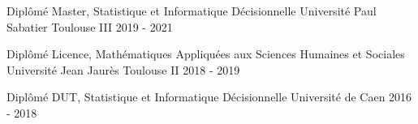 


\begin{cventries}


\cventry
{Diplômé} %
{Master, Statistique et Informatique Décisionnelle} %
{Université Paul Sabatier Toulouse III} %
{2019 - 2021} %
{} %


\cventry
{Diplômé} %
{Licence, Mathématiques Appliquées aux Sciences Humaines et Sociales} %
{Université Jean Jaurès Toulouse II} %
{2018 - 2019} %
{} %


\cventry
{Diplômé} %
{DUT, Statistique et Informatique Décisionnelle} %
{Université de Caen } %
{2016 - 2018} %
{} %


\end{cventries}